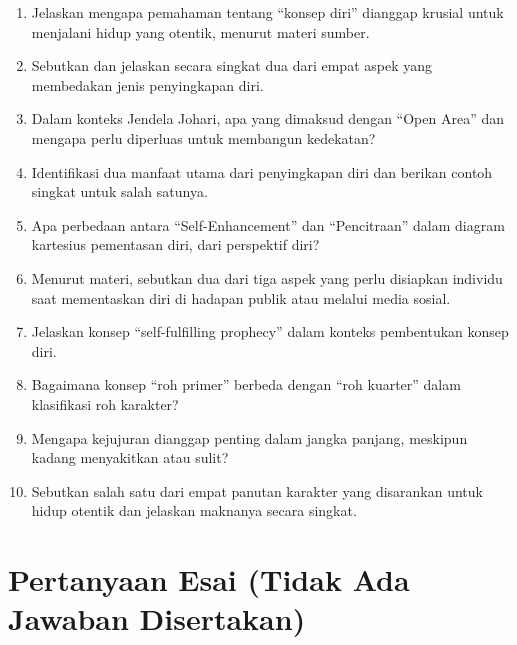 \documentclass[
  letterpaper,
  DIV=11,
  numbers=noendperiod]{scrreprt}
\providecommand{\tightlist}{%
  \setlength{\itemsep}{0pt}\setlength{\parskip}{0pt}}
\begin{document}
\begin{enumerate}
\def\labelenumi{\arabic{enumi}.}
\tightlist
\item
  Jelaskan mengapa pemahaman tentang ``konsep diri'' dianggap krusial
  untuk menjalani hidup yang otentik, menurut materi sumber.
\item
  Sebutkan dan jelaskan secara singkat dua dari empat aspek yang
  membedakan jenis penyingkapan diri.
\item
  Dalam konteks Jendela Johari, apa yang dimaksud dengan ``Open Area''
  dan mengapa perlu diperluas untuk membangun kedekatan?
\item
  Identifikasi dua manfaat utama dari penyingkapan diri dan berikan
  contoh singkat untuk salah satunya.
\item
  Apa perbedaan antara ``Self-Enhancement'' dan ``Pencitraan'' dalam
  diagram kartesius pementasan diri, dari perspektif diri?
\item
  Menurut materi, sebutkan dua dari tiga aspek yang perlu disiapkan
  individu saat mementaskan diri di hadapan publik atau melalui media
  sosial.
\item
  Jelaskan konsep ``self-fulfilling prophecy'' dalam konteks pembentukan
  konsep diri.
\item
  Bagaimana konsep ``roh primer'' berbeda dengan ``roh kuarter'' dalam
  klasifikasi roh karakter?
\item
  Mengapa kejujuran dianggap penting dalam jangka panjang, meskipun
  kadang menyakitkan atau sulit?
\item
  Sebutkan salah satu dari empat panutan karakter yang disarankan untuk
  hidup otentik dan jelaskan maknanya secara singkat.
\end{enumerate}


\chapter{Pertanyaan Esai (Tidak Ada Jawaban
Disertakan)}\label{pertanyaan-esai-tidak-ada-jawaban-disertakan}
\end{document}

